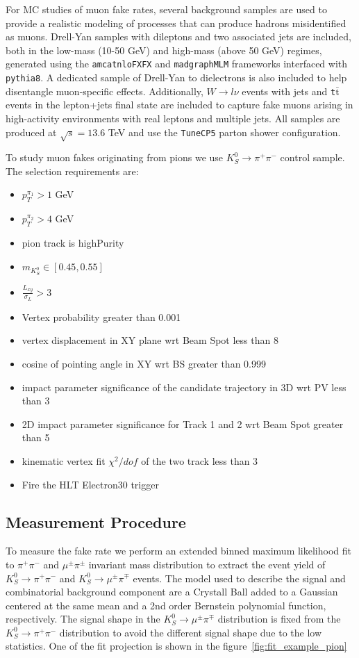 For MC studies of muon fake rates, several background samples are used to provide a realistic modeling of processes that can produce hadrons misidentified as muons. Drell-Yan samples with dileptons and two associated jets are included, both in the low-mass (10-50 GeV) and high-mass (above 50 GeV) regimes, generated using the \texttt{amcatnloFXFX} and \texttt{madgraphMLM} frameworks interfaced with \texttt{pythia8}. A dedicated sample of Drell-Yan to dielectrons is also included to help disentangle muon-specific effects. Additionally, \texttt{$W\to l \nu$} events with jets and \texttt{t$\bar{\text{t}}$} events in the lepton+jets final state are included to capture fake muons arising in high-activity environments with real leptons and multiple jets. All samples are produced at $\sqrt{s} = 13.6$ TeV and use the \texttt{TuneCP5} parton shower configuration.

To study muon fakes originating from pions we use $K_S^0 \to \pi^+ \pi^-$ control sample. The selection requirements are:
\begin{itemize}
\item $p_{T}^{\pi_1}>1$ GeV
\item $p_{T}^{\pi_2}>4$ GeV
\item pion track is highPurity
\item $m_{K_S^0}\in[0.45,0.55]$
\item $\frac{L_{xy}}{\sigma_L}>3$
\item Vertex probability greater than 0.001
\item vertex displacement in XY plane wrt Beam Spot less than 8
\item cosine of pointing angle in XY wrt BS greater than 0.999
\item impact parameter significance of the candidate trajectory in 3D wrt PV less than 3
\item 2D impact parameter significance for Track 1 and 2 wrt Beam Spot greater than 5
\item kinematic vertex fit $\chi^{2}/dof$ of the two track less than 3
\item Fire the HLT Electron30 trigger
\end{itemize}


\subsection{Measurement Procedure}

To measure the fake rate we perform an extended binned maximum likelihood fit to
$\pi^{+}\pi^{-}$ and $\mu^{\pm}\pi^{\pm}$ invariant mass distribution to extract
the event yield of $K_S^0 \to \pi^+ \pi^-$ and $K_S^0 \to \mu^\pm \pi^\mp$ events. The model used to describe the signal and combinatorial background component are a Crystall Ball added to a  Gaussian centered at the same mean and a 2nd order Bernstein polynomial function, respectively. The signal shape in the $K_S^0 \to \mu^\pm \pi^\mp$ distribution is fixed from the $K_S^0 \to \pi^+ \pi^-$  distribution to avoid the different signal shape due to the low statistics. One of the fit projection is shown in the figure~\ref{fig:fit_example_pion}

